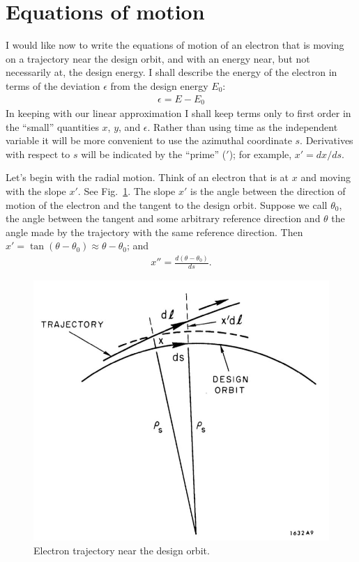 \section{Equations of motion}\label{sec:2.3}
I would like now to write the equations of motion of an electron that is moving on a trajectory near the design orbit, and with an energy near, but not necessarily at, the design energy. I shall describe the energy of the electron in terms of the deviation $\epsilon$ from the design energy $E_0$:
\begin{align}
	\epsilon = E-E_0
\end{align}
In keeping with our linear approximation I shall keep terms only to first order in the ``small'' quantities $x$, $y$, and $\epsilon$. Rather than using time as the independent variable it will be more convenient to use the azimuthal coordinate $s$. Derivatives with respect to $s$ will be indicated by the ``prime'' ($'$); for example, $x' = dx/ds$.

Let’s begin with the radial motion. Think of an electron that is at $x$ and moving with the slope $x'$. See Fig.~\ref{fig:fig9}. The slope $x'$ is the angle between the direction of motion of the electron and the tangent to the design orbit. Suppose we call $\theta_0$, the angle between the tangent and some arbitrary reference direction and $\theta$ the angle made by the trajectory with the same reference direction. Then $x' = \tan(\theta - \theta_0) \approx \theta - \theta_0$; and
\begin{align} \label{eq:2.12}
	x'' = \frac{d(\theta-\theta_0)}{ds}.
\end{align}

\begin{figure}[!htb]
	\centering
	\includegraphics[width=0.6\linewidth]{./Figuras/fig09.jpeg}
	\caption{Electron trajectory near the design orbit.}
	\label{fig:fig9}
\end{figure}

